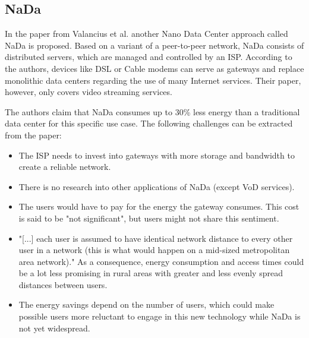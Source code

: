 \subsection{NaDa}
In the paper from Valancius et al. \cite{DBLP:conf/conext/ValanciusLMDR09} another Nano Data Center approach called NaDa is proposed. Based on a variant of a peer-to-peer network, NaDa consists of distributed servers, which are managed and controlled by an ISP. According to the authors, devices like DSL or Cable modems can serve as gateways and replace monolithic data centers regarding the use of many Internet services. Their paper, however, only covers video streaming services. 

The authors claim that NaDa consumes up to 30\% less energy than a traditional data center for this specific use case. The following challenges can be extracted from the paper:

\begin{itemize}
	\item The ISP needs to invest into gateways with more storage and bandwidth to create a reliable network.
	\item There is no research into other applications of NaDa (except VoD services).
	\item The users would have to pay for the energy the gateway consumes. This cost is said to be "not significant", but users might not share this sentiment.
	\item "[...] each user is assumed to have identical network distance to every other user in a network (this is what would happen on a mid-sized metropolitan area network)." As a consequence, energy consumption and access times could be a lot less promising in rural areas with greater and less evenly spread distances between users. 
	\item The energy savings depend on the number of users, which could make possible users more reluctant to engage in this new technology while NaDa is not yet widespread.
\end{itemize}